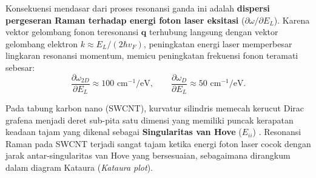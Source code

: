 Konsekuensi mendasar dari proses resonansi ganda ini adalah \textbf{dispersi pergeseran Raman terhadap energi foton laser eksitasi} ($\partial\omega / \partial E_L$). Karena vektor gelombang fonon teresonansi $\mathbf{q}$ terhubung langsung dengan vektor gelombang elektron $k \approx E_L / (2\hbar v_F)$, peningkatan energi laser memperbesar lingkaran resonansi momentum, memicu peningkatan frekuensi fonon teramati sebesar:
\begin{equation}
\frac{\partial \omega_{2D}}{\partial E_L} \approx 100\text{ cm}^{-1}/\text{eV}, \qquad
\frac{\partial \omega_{D}}{\partial E_L} \approx 50\text{ cm}^{-1}/\text{eV}.
\label{eq:dispersi_resonansi_ganda}
\end{equation}

Pada tabung karbon nano (SWCNT), kurvatur silindris memecah kerucut Dirac grafena menjadi deret sub-pita satu dimensi yang memiliki puncak kerapatan keadaan tajam yang dikenal sebagai \textbf{Singularitas van Hove} ($E_{ii}$) \cite{dresselhaus2005raman}. Resonansi Raman pada SWCNT terjadi sangat tajam ketika energi foton laser cocok dengan jarak antar-singularitas van Hove yang bersesuaian, sebagaimana dirangkum dalam diagram Kataura (\textit{Kataura plot}).
